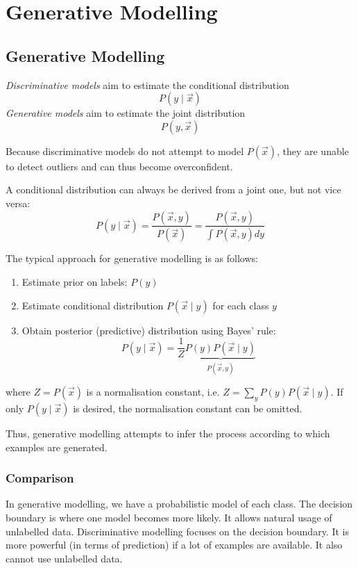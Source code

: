 \chapter{Generative Modelling}

\section{Generative Modelling}
\emph{Discriminative models} aim to estimate
the conditional distribution
\begin{equation*}
P(y \mid \vec{x})
\end{equation*}
\emph{Generative models} aim to estimate
the joint distribution
\begin{equation*}
P(y, \vec{x})
\end{equation*}

Because discriminative models do not attempt
to model $P(\vec{x})$,
they are unable to detect outliers
and can thus become overconfident.

A conditional distribution can always be
derived from a joint one, but not vice versa:
\begin{equation*}
P(y \mid \vec{x})
= \frac{P(\vec{x}, y)}{P(\vec{x})}
= \frac{P(\vec{x}, y)}{
	\int{P(\vec{x}, y) dy}
}
\end{equation*}

The typical approach for generative
modelling is as follows:
\begin{enumerate}
	\item Estimate prior on labels: $P(y)$
	\item Estimate conditional distribution
	$P(\vec{x} \mid y)$ for each class $y$
	\item Obtain posterior (predictive) distribution
	using Bayes' rule:
	\begin{equation*}
	P(y \mid \vec{x}) =
	\frac{1}{Z} 
	\underbrace{P(y) P(\vec{x} \mid y)}_{P(\vec{x}, y)}
	\end{equation*}
\end{enumerate}
where $Z = P(\vec{x})$ is a normalisation
constant,
i.e. $Z = \sum_y{P(y) P(\vec{x} \mid y)}$.
If only $P(y \mid \vec{x})$ is desired,
the normalisation constant can be omitted.

Thus, generative modelling attempts to
infer the process according to which
examples are generated.

\subsection{Comparison}
In generative modelling, we have a
probabilistic model of each class.
The decision boundary is where one
model becomes more likely.
It allows natural usage of unlabelled data.
Discriminative modelling focuses
on the decision boundary.
It is more powerful (in terms of prediction)
if a lot of examples are available.
It also cannot use unlabelled data.

